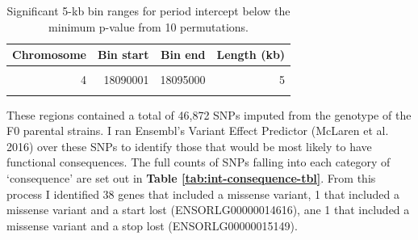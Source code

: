 \documentclass[
]{book}
\begin{document}
\begin{table}

\caption{\label{tab:somite-sig-int-tbl}Significant 5-kb bin ranges for period intercept below the minimum p-value from 10 permutations.}
\centering
\begin{tabular}[t]{rrrr}
\toprule
Chromosome & Bin start & Bin end & Length (kb)\\
\midrule
\cellcolor{gray!6}{3} & \cellcolor{gray!6}{31880001} & \cellcolor{gray!6}{35420000} & \cellcolor{gray!6}{3540}\\
4 & 18090001 & 18095000 & 5\\
\cellcolor{gray!6}{10} & \cellcolor{gray!6}{2995001} & \cellcolor{gray!6}{3690000} & \cellcolor{gray!6}{695}\\
\bottomrule
\end{tabular}
\end{table}

These regions contained a total of 46,872 SNPs imputed from the genotype of the F0 parental strains.
I ran Ensembl's Variant Effect Predictor (McLaren et al. 2016) over these SNPs to identify those that would be most likely to have functional consequences. The full counts of SNPs falling into each category of `consequence' are set out in \textbf{Table \ref{tab:int-consequence-tbl}}. From this process I identified 38 genes that included a missense variant, 1 that included a missense variant and a start lost (ENSORLG00000014616), ane 1 that included a missense variant and a stop lost (ENSORLG00000015149).
\end{document}
